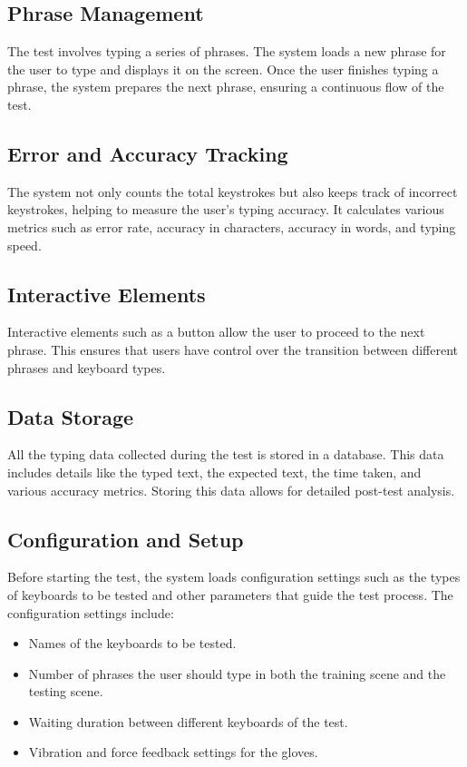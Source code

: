 \subsection{Phrase Management}
The test involves typing a series of phrases. The system loads a new phrase for the user to type and displays it on the screen. Once the user finishes typing a phrase, the system prepares the next phrase, ensuring a continuous flow of the test.

\subsection{Error and Accuracy Tracking}
The system not only counts the total keystrokes but also keeps track of incorrect keystrokes, helping to measure the user's typing accuracy. It calculates various metrics such as error rate, accuracy in characters, accuracy in words, and typing speed.

\subsection{Interactive Elements}
Interactive elements such as a button allow the user to proceed to the next phrase. This ensures that users have control over the transition between different phrases and keyboard types.

\subsection{Data Storage}
All the typing data collected during the test is stored in a database. This data includes details like the typed text, the expected text, the time taken, and various accuracy metrics. Storing this data allows for detailed post-test analysis.

\subsection{Configuration and Setup}
Before starting the test, the system loads configuration settings such as the types of keyboards to be tested and other parameters that guide the test process. The configuration settings include:
\begin{itemize}
    \item Names of the keyboards to be tested.
    \item Number of phrases the user should type in both the training scene and the testing scene.
    \item Waiting duration between different keyboards of the test.
    \item Vibration and force feedback settings for the gloves.
\end{itemize}

